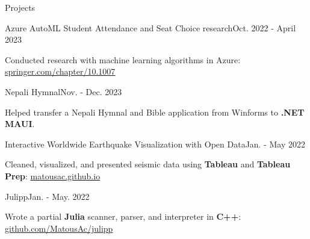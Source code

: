 \begin{rSection}{Projects}
  \begin{project}{Azure AutoML Student Attendance and Seat Choice research}{Oct. 2022 - April 2023}
    \item Conducted research with machine learning algorithms in Azure: \href{https://link.springer.com/chapter/10.1007/978-3-031-47721-8_42}{springer.com/chapter/10.1007}
  \end{project}
  \begin{project}{Nepali Hymnal}{Nov. - Dec. 2023}
    \item Helped transfer a Nepali Hymnal and Bible application from Winforms to {\bf .NET} {\bf MAUI}.
  \end{project}
  \begin{project}{Interactive Worldwide Earthquake Visualization with Open Data}{Jan. - May 2022}
    \item Cleaned, visualized, and presented seismic data using {\bf Tableau} and {\bf Tableau Prep}: \href{https://matousac.github.io/}{matousac.github.io}
  \end{project}
  \begin{project}{Julipp}{Jan. - May. 2022}
    \item Wrote a partial {\bf Julia} scanner, parser, and interpreter in {\bf C++}: \href{https://github.com/MatousAc/julipp}{github.com/MatousAc/julipp}
  \end{project}
\end{rSection}